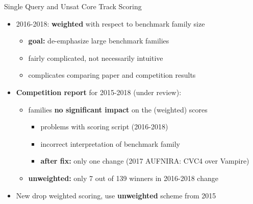 \documentclass[10pt]{beamer}
\newcommand{\orange}[1]{\textcolor{mLightBrown}{#1}}
\newcommand{\orangea}{\ensuremath{\textcolor{mLightBrown}{\longrightarrow}}\xspace}
\begin{document}
  \begin{frame}{Single Query and Unsat Core Track Scoring}
    \begin{itemize}
      \item \orange{2016-2018}:
        \textbf{weighted} with respect to benchmark family size
        \begin{itemize}
          \item \textbf{goal:} de-emphasize large benchmark families
          \item fairly complicated, not necessarily intuitive
          \item complicates comparing paper and competition results
        \end{itemize}
      \vspace{2ex}
      \item \textbf{Competition report} for 2015-2018 (under review):
        \begin{itemize}
          \setbeamertemplate{itemize items}{\orangea}
          \item families \textbf{no significant impact} on the (weighted)
            scores
            \begin{itemize}
              \item problems with scoring script (2016-2018)
              \item incorrect interpretation of benchmark family 
              \item \textbf{after fix:} only one change
              (2017 AUFNIRA: CVC4 over Vampire)
            \end{itemize}
          \item \textbf{unweighted:} only 7 out of 139 winners in
            2016-2018 change
      \end{itemize}
      \vspace{2ex}
      \item \orange{New} drop weighted scoring, use \textbf{unweighted} scheme
        from 2015
    \end{itemize}
  \end{frame}
\end{document}
